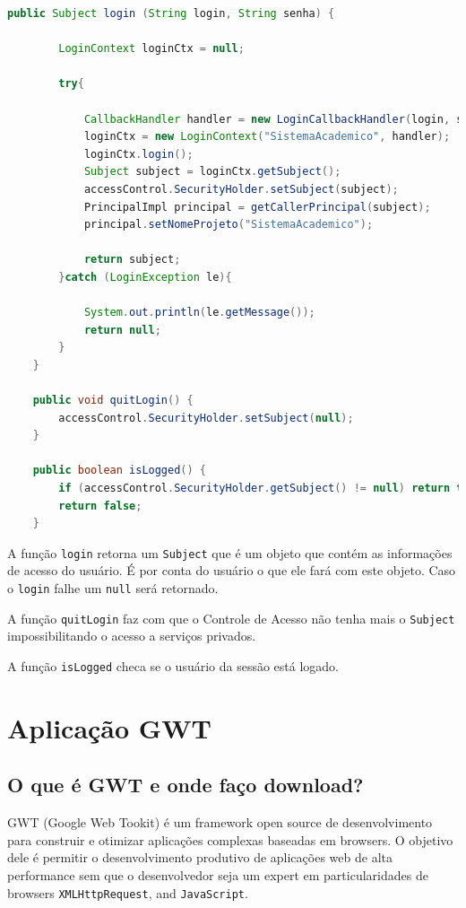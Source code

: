 \begin{framed}
\begin{lstlisting}[language=java, breaklines=true]
	public Subject login (String login, String senha) {

		LoginContext loginCtx = null;

		try{
			
			CallbackHandler handler = new LoginCallbackHandler(login, senha);
			loginCtx = new LoginContext("SistemaAcademico", handler);
			loginCtx.login();
			Subject subject = loginCtx.getSubject();
			accessControl.SecurityHolder.setSubject(subject);
			PrincipalImpl principal = getCallerPrincipal(subject);
			principal.setNomeProjeto("SistemaAcademico");

			return subject;
		}catch (LoginException le){
			
			System.out.println(le.getMessage());
			return null;
		}
	}
	
	public void quitLogin() {
		accessControl.SecurityHolder.setSubject(null);
	}
	
	public boolean isLogged() {
		if (accessControl.SecurityHolder.getSubject() != null) return true;
		return false;
	}
\end{lstlisting}
\end{framed}

A função \texttt{login} retorna um \texttt{Subject} que é um objeto que contém as informações de acesso do usuário. É por conta do
usuário o que ele fará com este objeto. Caso o \texttt{login} falhe um \texttt{null} será retornado.

A função \texttt{quitLogin} faz com que o Controle de Acesso não tenha mais o \texttt{Subject} impossibilitando o acesso a
serviços privados.

A função \texttt{isLogged} checa se o usuário da sessão está logado.

\section{Aplicação GWT}

\subsection{O que é GWT e onde faço download?}

GWT (Google Web Tookit) é um framework open source de desenvolvimento para construir e otimizar aplicações complexas baseadas em
browsers. O objetivo dele é permitir o desenvolvimento produtivo de aplicações web de alta performance sem que o desenvolvedor
seja um expert em particularidades de browsers \texttt{XMLHttpRequest}, and \texttt{JavaScript}.

